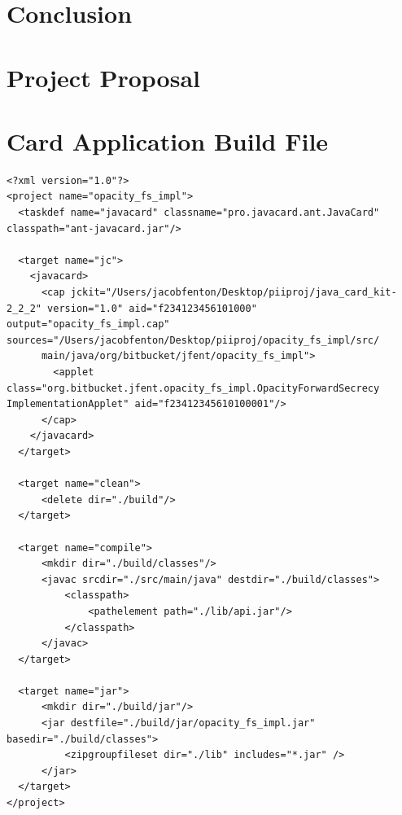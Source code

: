 \documentclass[12pt,a4paper,twoside,openright]{report}
\begin{document}
\chapter{Conclusion}




\appendix

\chapter{Project Proposal}
\label{appendix:proposal}



\chapter{Card Application Build File}
\label{appendix:cardappbuildfile}

\begin{verbatim}
<?xml version="1.0"?>
<project name="opacity_fs_impl">
  <taskdef name="javacard" classname="pro.javacard.ant.JavaCard" classpath="ant-javacard.jar"/>

  <target name="jc">
    <javacard>
      <cap jckit="/Users/jacobfenton/Desktop/piiproj/java_card_kit-2_2_2" version="1.0" aid="f234123456101000" output="opacity_fs_impl.cap" sources="/Users/jacobfenton/Desktop/piiproj/opacity_fs_impl/src/
      main/java/org/bitbucket/jfent/opacity_fs_impl">
        <applet class="org.bitbucket.jfent.opacity_fs_impl.OpacityForwardSecrecy ImplementationApplet" aid="f23412345610100001"/>
      </cap>
    </javacard>
  </target>

  <target name="clean">
      <delete dir="./build"/>
  </target>

  <target name="compile">
      <mkdir dir="./build/classes"/>
      <javac srcdir="./src/main/java" destdir="./build/classes">
          <classpath>
              <pathelement path="./lib/api.jar"/>
          </classpath>
      </javac>
  </target>

  <target name="jar">
      <mkdir dir="./build/jar"/>
      <jar destfile="./build/jar/opacity_fs_impl.jar" basedir="./build/classes">
          <zipgroupfileset dir="./lib" includes="*.jar" />
      </jar>
  </target>
</project>
\end{verbatim}
\end{document}
